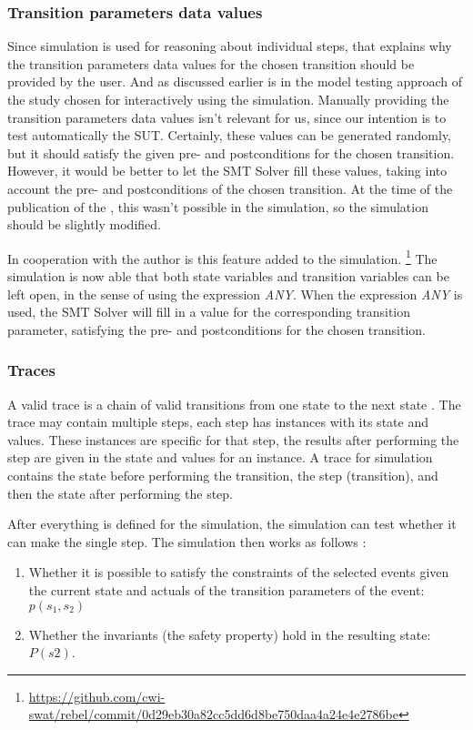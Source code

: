 \subsubsection*{Transition parameters data values}
Since simulation is used for reasoning about individual steps, that explains why
the transition parameters data values for the chosen transition should be
provided by the user. And as discussed earlier is in the model testing approach
of the study \cite[p.6]{stoel_storm_vinju_bosman_2016} chosen for interactively
using the simulation. Manually providing the transition parameters data values
isn't relevant for us, since our intention is to test automatically the SUT.
Certainly, these values can be generated randomly, but it should satisfy the
given pre- and postconditions for the chosen transition. However, it would be
better to let the SMT Solver fill these values, taking into account the pre- and
postconditions of the chosen transition. At the time of the publication of the
\cite{stoel_storm_vinju_bosman_2016}, this wasn't possible in the simulation, so
the simulation should be slightly modified.

In cooperation with the author is this feature added to the simulation.
\footnote{\url{https://github.com/cwi-swat/rebel/commit/0d29eb30a82cc5dd6d8be750daa4a24e4e2786be}}
The simulation is now able that both state variables and transition variables
can be left open, in the sense of using the expression \textit{ANY}. When the
expression \textit{ANY} is used, the SMT Solver will fill in a value for the
corresponding transition parameter, satisfying the pre- and postconditions for
the chosen transition. 

\subsubsection*{Traces}
A valid trace is a chain of valid transitions from one state to the next state
\cite[p.5]{stoel_storm_vinju_bosman_2016}. The trace may contain multiple steps,
each step has instances with its state and values. These instances are specific
for that step, the results after performing the step are given in the state and
values for an instance. A trace for simulation contains the state before
performing the transition, the step (transition), and then the state after
performing the step.

After everything is defined for the simulation, the simulation can test whether
it can make the single step. The simulation then works as follows
\cite[p.6]{stoel_storm_vinju_bosman_2016}:
\begin{enumerate}
\item Whether it is possible to satisfy the constraints of the selected events
given the current state and actuals of the transition parameters of the event:
$p(s_{1}, s_{2})$
\item Whether the invariants (the safety property) hold in the resulting state:
$P(s2)$.
\end{enumerate}

